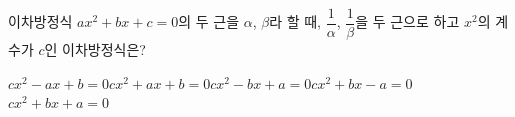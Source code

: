 이차방정식 $ax^2+bx+c=0$의 두 근을 $\alpha$, $\beta$라 할 때, $\dfrac{1}{\alpha}$, $\dfrac{1}{\beta}$을 두 근으로 하고 $x^2$의 계수가 $c$인 이차방정식은? 
\begin{choicesii}{$cx^2-ax+b=0$}{$cx^2+ax+b=0$}{$cx^2-bx+a=0$}{$cx^2+bx-a=0$}{$cx^2+bx+a=0$}\end{choicesii}
